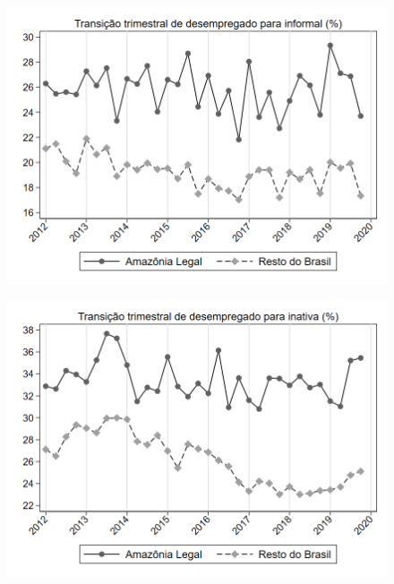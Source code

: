 \begin{frame}[label=_transicao_ocupacao_sh_desempregado_sh_informal]{}
\textit{\hyperlink{_transicao_ocupacao}{}}
\begin{figure}
  \centering
  \includegraphics[width=1.0\linewidth]{../../analysis/output/transicao_ocupacao/_transicao_ocupacao_sh_desempregado_sh_informal.png}
  \caption{}
  \label{fig:_transicao_ocupacao_sh_desempregado_sh_informal}
\end{figure}
\end{frame}

\begin{frame}[label=_transicao_ocupacao_sh_desempregado_sh_inativa]{}
\textit{\hyperlink{_transicao_ocupacao}{}}
\begin{figure}
  \centering
  \includegraphics[width=1.0\linewidth]{../../analysis/output/transicao_ocupacao/_transicao_ocupacao_sh_desempregado_sh_inativa.png}
  \caption{}
  \label{fig:_transicao_ocupacao_sh_desempregado_sh_inativa}
\end{figure}
\end{frame}

